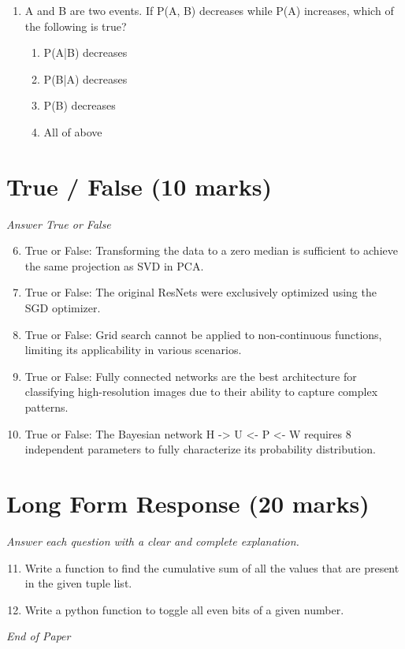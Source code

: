 \documentclass[12pt]{article}
\begin{document}
\begin{enumerate}[label=\arabic*.]
\begin{enumerate}[label=(\alph*)]
    \item True, False
    \item False, True
\end{enumerate}
\item A and B are two events. If P(A, B) decreases while P(A) increases, which of the following is true?
\begin{enumerate}[label=(\alph*)]
    \item P(A|B) decreases
    \item P(B|A) decreases
    \item P(B) decreases
    \item All of above
\end{enumerate}
\end{enumerate}

\section*{True / False (10 marks)}
\textit{Answer True or False}
\begin{enumerate}[label=\arabic*.]
\setcounter{enumi}{5}
\item True or False: Transforming the data to a zero median is sufficient to achieve the same projection as SVD in PCA.
\item True or False: The original ResNets were exclusively optimized using the SGD optimizer.
\item True or False: Grid search cannot be applied to non-continuous functions, limiting its applicability in various scenarios.
\item True or False: Fully connected networks are the best architecture for classifying high-resolution images due to their ability to capture complex patterns.
\item True or False: The Bayesian network H -\textgreater{} U \textless{}- P \textless{}- W requires 8 independent parameters to fully characterize its probability distribution.
\end{enumerate}

\section*{Long Form Response (20 marks)}
\textit{Answer each question with a clear and complete explanation.}
\begin{enumerate}[label=\arabic*.]
\setcounter{enumi}{10}
\item Write a function to find the cumulative sum of all the values that are present in the given tuple list.
\item Write a python function to toggle all even bits of a given number.
\end{enumerate}

\vfill
\noindent\textit{End of Paper}
\end{document}
